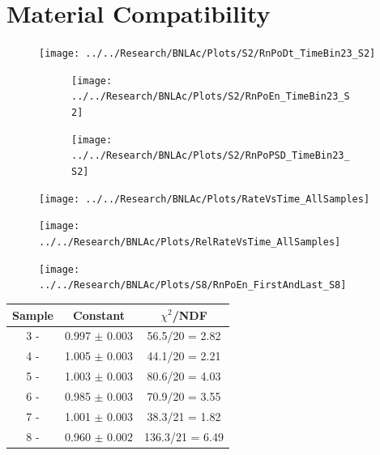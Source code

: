


\section{Material Compatibility}


\begin{figure}[H]
	\centering
	\texttt{[image: ../../Research/BNLAc/Plots/S2/RnPoDt\_TimeBin23\_S2]}
	\caption{}
	\label{fig:rnpodttimebin23s2}
\end{figure}

\begin{figure}[H]
	\centering
\begin{subfigure}{0.5\linewidth}
	\centering
	\texttt{[image: ../../Research/BNLAc/Plots/S2/RnPoEn\_TimeBin23\_S2]}
	\caption{}
\end{subfigure}%
\begin{subfigure}{0.5\linewidth}
	\centering
	\texttt{[image: ../../Research/BNLAc/Plots/S2/RnPoPSD\_TimeBin23\_S2]}
	\caption{}
\end{subfigure}
	\caption{}
	\label{fig:rnpoenpsd}
\end{figure}


\begin{figure}[H]
	\centering
	\texttt{[image: ../../Research/BNLAc/Plots/RateVsTime\_AllSamples]}
	\caption{}
	\label{fig:ratevstimeallsamples}
\end{figure}

\begin{figure}[H]
	\centering
	\texttt{[image: ../../Research/BNLAc/Plots/RelRateVsTime\_AllSamples]}
	\caption{}
	\label{fig:relratevstimeallsamples}
\end{figure}

\begin{figure}[H]
	\centering
	\texttt{[image: ../../Research/BNLAc/Plots/S8/RnPoEn\_FirstAndLast\_S8]}
	\caption{}
	\label{fig:rnpoenfirstandlasts8}
\end{figure}


\begin{table}[H]
	\centering
\begin{tabular}{|c|c|c|}
	\hline 
	Sample & Constant & $\chi^2$/NDF \\ 
	\hline 
	3 -  & 0.997 $\pm$ 0.003 & 56.5/20 = 2.82 \\ 
	\hline 
	4 - & 1.005 $\pm$ 0.003 & 44.1/20 = 2.21 \\ 
	\hline 
	5 - & 1.003 $\pm$ 0.003 & 80.6/20 = 4.03 \\ 
	\hline 
	6 - & 0.985 $\pm$ 0.003 & 70.9/20 = 3.55 \\ 
	\hline 
	7 - & 1.001 $\pm$ 0.003 & 38.3/21 = 1.82 \\ 
	\hline 
	8 -  & 0.960 $\pm$ 0.002 & 136.3/21 = 6.49 \\ 
	\hline 
\end{tabular} 
\end{table}

